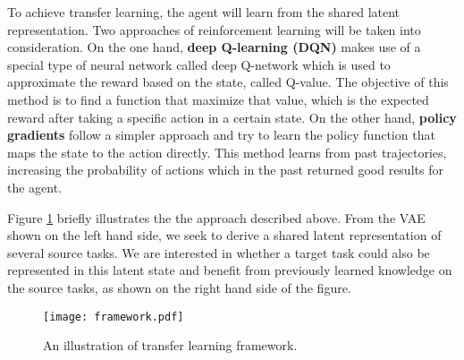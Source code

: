 To achieve transfer learning, the agent will learn from the shared latent representation. 
Two approaches of reinforcement learning will be taken into consideration. On the one hand, \textbf{deep Q-learning (DQN)} makes use of a special type of neural network called deep Q-network which is used to approximate the reward based on the state, called Q-value. The objective of this method is to find a function that maximize that value, which is the expected reward after taking a specific action in a certain  state. On the other hand, \textbf{policy gradients} follow a simpler approach and try to learn the policy function that maps the state to the action directly. This method learns from past trajectories, increasing the probability of actions which in the past returned good results for the agent.

Figure \ref{framework} briefly illustrates the the approach described above. From the VAE shown on the left hand side, we seek to derive a shared latent representation of several source tasks. We are interested in whether a target task could also be represented in this latent state and benefit from previously learned knowledge on the source tasks, as shown on the right hand side of the figure.

\begin{figure}[h!]
	\centering
	\texttt{[image: framework.pdf]}
	\caption{An illustration of transfer learning framework.}
	\label{framework}
\end{figure}



